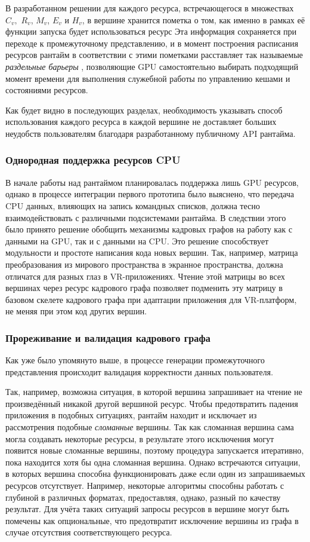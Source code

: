 В разработанном решении для каждого ресурса, встречающегося в множествах $C_v,$ $R_v$, $M_v$, $E_v$ и $H_v$, в вершине хранится пометка о том, как именно в рамках её функции запуска будет использоваться ресурс
Эта информация сохраняется при переходе к промежуточному представлению, и в момент построения расписания ресурсов рантайм в соответствии с этими пометками расставляет так называемые \textit{раздельные барьеры} \cite[раздел~7.5]{VulkanSpec}, позволяющие GPU самостоятельно выбирать подходящий момент времени для выполнения служебной работы по управлению кешами и состояниями ресурсов.

Как будет видно в последующих разделах, необходимость указывать способ использования каждого ресурса в каждой вершине не доставляет больших неудобств пользователям благодаря разработанному публичному API рантайма.

\subsubsection{Однородная поддержка ресурсов CPU}
В начале работы над рантаймом планировалась поддержка лишь GPU ресурсов, однако в процессе интеграции первого прототипа было выяснено, что передача CPU данных, влияющих на запись командных списков, должна тесно взаимодействовать с различными подсистемами рантайма.
В следствии этого было принято решение обобщить механизмы кадровых графов на работу как с данными на GPU, так и с данными на CPU.
Это решение способствует модульности и простоте написания кода новых вершин.
Так, например, матрица преобразования из мирового пространства в экранное пространства, должна отличатся для разных глаз в VR-приложениях.
Чтение этой матрицы во всех вершинах через ресурс кадрового графа позволяет подменить эту матрицу в базовом скелете кадрового графа при адаптации приложения для VR-платформ, не меняя при этом код других вершин.

\subsubsection{Прореживание и валидация кадрового графа}
Как уже было упомянуто выше, в процессе генерации промежуточного представления происходит валидация корректности данных пользователя.

Так, например, возможна ситуация, в которой вершина запрашивает на чтение не произведённый никакой другой вершиной ресурс.
Чтобы предотвратить падения приложения в подобных ситуациях, рантайм находит и исключает из рассмотрения подобные \textit{сломанные} вершины.
Так как сломанная вершина сама могла создавать некоторые ресурсы, в результате этого исключения могут появится новые сломанные вершины, поэтому процедура запускается итеративно, пока находится хотя бы одна сломанная вершина.
Однако встречаются ситуации, в которых вершина способна функционировать даже если один из запрашиваемых ресурсов отсутствует.
Например, некоторые алгоритмы способны работать с глубиной в различных форматах, предоставляя, однако, разный по качеству результат.
Для учёта таких ситуаций запросы ресурсов в вершине могут быть помечены как опциональные, что предотвратит исключение вершины из графа в случае отсутствия соответствующего ресурса.

